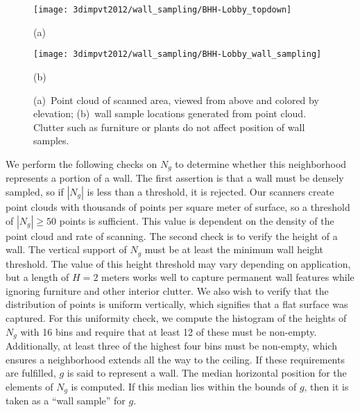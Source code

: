 \documentclass[12pt,onecolumn,oneside]{book}
\begin{document}
\begin{figure}[p]
\centering
\begin{minipage}[b]{0.6\linewidth}
  \centering
  \centerline{\texttt{[image: 3dimpvt2012/wall\_sampling/BHH-Lobby\_topdown]}}
  \centerline{(a)}\medskip
\end{minipage}
\hfill
\begin{minipage}[b]{0.6\linewidth}
  \centering
  \centerline{\texttt{[image: 3dimpvt2012/wall\_sampling/BHH-Lobby\_wall\_sampling]}}
  \centerline{(b)}\medskip
\end{minipage}

\caption[Wall sampling from static point cloud.]{(a)~Point cloud of scanned area, viewed from above and colored by elevation; (b)~wall sample locations generated from point cloud.  Clutter such as furniture or plants do not affect position of wall samples.}
\label{fig:bhh_wall_sampling_example}

\end{figure}

We perform the following checks on $N_g$ to determine whether this neighborhood represents a portion of a wall.  The first assertion is that a wall must be densely sampled, so if $|N_g|$ is less than a threshold, it is rejected. Our scanners create point clouds with thousands of points per square meter of surface, so a threshold of $|N_g| \geq 50$ points is sufficient.  This value is dependent on the density of the point cloud and rate of scanning.  The second check is to verify the height of a wall.  The vertical support of $N_g$ must be at least the minimum wall height threshold. The value of this height threshold may vary depending on application, but a length of $H = 2$ meters works well to capture permanent wall features while ignoring furniture and other interior clutter.  We also wish to verify that the distribution of points is uniform vertically, which signifies that a flat surface was captured.  For this uniformity check, we compute the histogram of the heights of $N_g$ with 16 bins and require that at least 12 of these must be non-empty.  Additionally, at least three of the highest four bins must be non-empty, which ensures a neighborhood extends all the way to the ceiling.  If these requirements are fulfilled, $g$ is said to represent a wall.  The median horizontal position for the elements of $N_g$ is computed.  If this median lies within the bounds of $g$, then it is taken as a ``wall sample'' for $g$.
\end{document}
